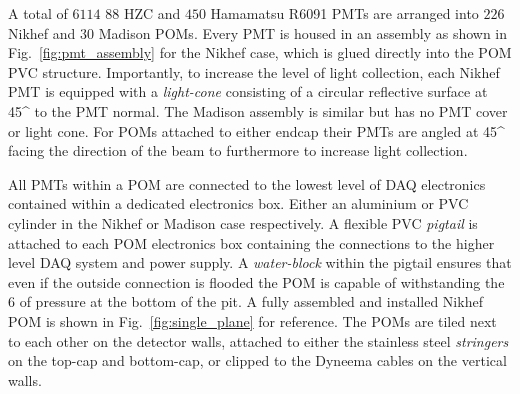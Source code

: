 A total of $6114$ \unit{88}{} HZC and $450$ Hamamatsu R6091 PMTs are arranged into
$226$ Nikhef and $30$ Madison POMs. Every PMT is housed in an assembly as shown in
Fig.~\ref{fig:pmt_assembly} for the Nikhef case, which is glued directly into the POM PVC
structure. Importantly, to increase the level of light collection, each Nikhef PMT is equipped
with a \emph{light-cone} consisting of a circular reflective surface at \unit{45}{^\circ} to the
PMT normal. The Madison assembly is similar but has no PMT cover or light cone. For POMs attached
to either endcap their PMTs are angled at \unit{45}{^\circ} facing the direction of the beam to
furthermore to increase light collection.

All PMTs within a POM are connected to the lowest level of DAQ electronics contained within a
dedicated electronics box. Either an aluminium or PVC cylinder in the Nikhef or Madison case
respectively. A flexible PVC \emph{pigtail} is attached to each POM electronics box containing the
connections to the higher level DAQ system and power supply. A \emph{water-block} within the
pigtail ensures that even if the outside connection is flooded the POM is capable of withstanding
the \unit{6}{} of pressure at the bottom of the pit. A fully assembled and installed
Nikhef POM is shown in Fig.~\ref{fig:single_plane} for reference. The POMs are tiled next to each
other on the detector walls, attached to either the stainless steel \emph{stringers} on the
top-cap and bottom-cap, or clipped to the Dyneema cables on the vertical walls.

